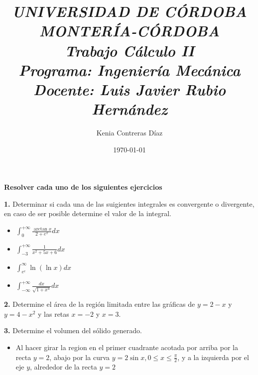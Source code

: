 \documentclass[12pt]{article}
\title{\textbf{\textit{\large{UNIVERSIDAD DE CÓRDOBA\\ MONTERÍA-CÓRDOBA\\ Trabajo Cálculo II\\ Programa: Ingeniería Mecánica\\Docente: Luis Javier Rubio Hernández\\}}}}
\author{Kenia Contreras Díaz}
\date{\today}
\begin{document}
\maketitle
\thispagestyle{fancy}
\begin{flushleft}


\textbf{Resolver cada uno de los siguientes ejercicios}\\
\vspace{0.5cm}




\textbf{1.} Determinar si cada una de las suigientes integrales es convergente o divergente, en caso de ser posible determine el valor de la integral.
\vspace{0.5cm}


\begin{multicols}{2}
\begin{itemize}


\Large \item $\int_{0}^{+\infty }\frac{\arctan x}{2+e^{x}}dx$



\Large\item $\int_{-3}^{+\infty }\frac{1}{x^{2}+5x+6}dx$

\columnbreak


\large\item $\int_{e^{e}}^{\infty }\ln\left ( \ln x \right )dx$



\large\item $\int_{-\infty}^{+\infty }\frac{dx}{\sqrt{1+x^{4}}}dx$

\end{itemize}
\end{multicols}
\vspace{0.5cm}


\textbf{2.} Determine el área de la región limitada entre las gráficas de $y=2-x$ y $y=4-x^{2}$ y las retas $x=-2$ y $x=3$.
\vspace{0.5cm}



\textbf{3.} Determine el volumen del sólido generado. 


\begin{itemize}


    \item Al hacer girar la region en el primer cuadrante acotada por arriba por la recta $y=2$, abajo por la curva $y=2\sin{x},0\leq x\leq \frac{\pi}{2}$, y a la izquierda por el eje $y$, alrededor de la recta $y=2$



\end{itemize}
\end{flushleft}
\end{document}
